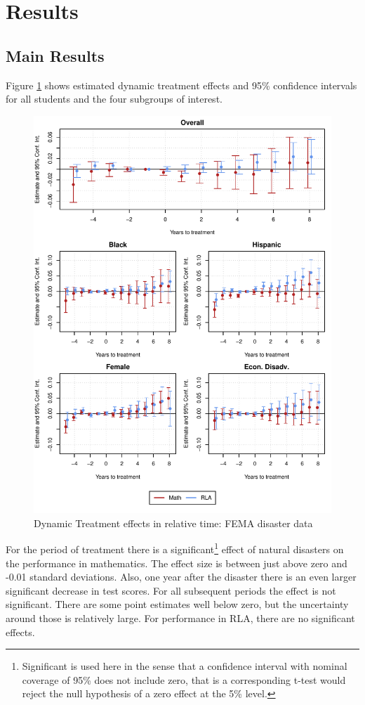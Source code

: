 \section{Results} \label{Results}

\subsection{Main Results}

Figure \ref{ResultsPlot} shows estimated dynamic treatment effects and 95\% confidence intervals for all students and the four subgroups of interest. 

\begin{figure}[!h]
	\centering
	\includegraphics[scale=1]{"../Code & Data/ResultsPlot.pdf"}
	\caption{Dynamic Treatment effects in relative time: FEMA disaster data}
	\label{ResultsPlot}
\end{figure}


For the period of treatment there is a significant\footnote{Significant is used here in the sense that a confidence interval with nominal coverage of 95\% does not include zero, that is a corresponding t-test would reject the null hypothesis of a zero effect at the 5\% level.} effect of natural disasters on the performance in mathematics. The effect size is between just above zero and -0.01 standard deviations. Also, one year after the disaster there is an even larger significant decrease in test scores. For all subsequent periods the effect is not significant. There are some point estimates well below zero, but the uncertainty around those is relatively large. For performance in RLA, there are no significant effects.

